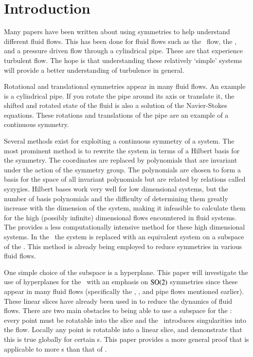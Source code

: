 \section{Introduction}
\label{sect:intro}

Many papers have been written about using symmetries to help understand different fluid flows. This has been done for fluid flows such as the \KS\ flow, the {\pCf}, and a pressure driven flow through a cylindrical pipe. These are  that experience turbulent flow. The hope is that understanding these relatively `simple' systems will provide a better understanding of turbulence in general.

Rotational and translational symmetries appear in many fluid flows. An example is a cylindrical pipe. If you rotate the pipe around its axis or translate it, the shifted and rotated state of the fluid is also a solution of the Navier-Stokes equations. These rotations and translations of the pipe are an example of a continuous symmetry.

Several methods exist for exploiting a continuous symmetry of a system. The most prominent method is to rewrite the system in terms of a Hilbert basis for the symmetry. The {\statesp} coordinates are replaced by polynomials that are invariant under the action of the symmetry group. The polynomials are chosen to form a basis for the space of all invariant polynomials but are related by relations called syzygies. Hilbert bases work very well for low dimensional systems, but the number of basis polynomials and the difficulty of determining them greatly increase with the dimension of the system, making it infeasible to calculate them for the high (possibly infinite) dimensional flows encountered in fluid systems. The \mslices{} provides a less computationally intensive method for these high dimensional systems. In the \mslices\ the system is replaced with an equivalent system on a subspace of the \statesp. This method is already being employed to reduce symmetries in various fluid flows.

One simple choice of the subspace is a hyperplane. This paper will investigate the use of hyperplanes for the \mslices\ with an emphasis on $\textrm{SO}(2)$ symmetries since these appear in many fluid flows (specifically the \KS, {\pCf}, and pipe flows mentioned earlier). These linear slices have already been used in  to reduce the dynamics of fluid flows.
There are two main obstacles to being able to use a subspace for the \mslices: every point must be rotatable into the slice and the \mslices\ introduces singularities into the flow.
Locally any point is rotatable into a linear slice, and  demonstrate that this is true globally for certain {\statesp}s. This paper provides a more general proof that is applicable to more {\statesp}s than that of .

